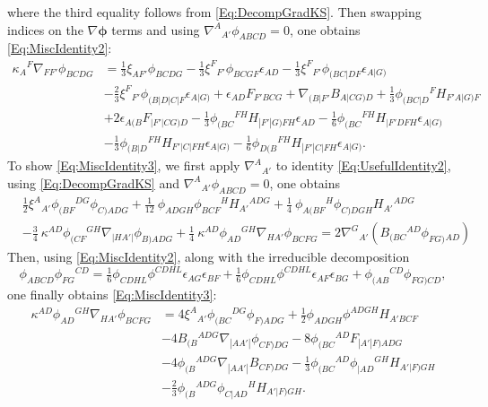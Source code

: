 \documentclass[10pt,a4paper]{article}
\theoremstyle{plain}
\begin{document}
where the third equality follows from \eqref{Eq:DecompGradKS}. Then
swapping indices on the $\nabla\bm\phi$ terms and using
$\nabla^A{}_{A'}\phi_{ABCD}=0$, one obtains \eqref{Eq:MiscIdentity2}:
\begin{align*}
    \kappa_{A}{}^{F} \nabla_{FF'}\phi_{BCDG} &= \tfrac{1}{3} \xi_{AF'}
    \phi_{BCDG} - \tfrac{1}{3} \xi^{F}{}_{F'} \phi_{BCGF}
    \epsilon_{AD} - \tfrac{1}{3}
    \xi^{F}{}_{F'}\phi_{(BC|DF}\epsilon_{A|G)} \nonumber \\ & -
    \tfrac{2}{3} \xi^{F}{}_{F'}\phi_{(B|D|C|F}\epsilon_{A|G)} +
    \epsilon_{AD} F_{F'BCG} + \nabla_{(B|F'}B_{A|CG)D} + \tfrac{1}{3}
    \phi_{(BC|D}{}^{F}H_{F'A|G)F} \nonumber \\& + 2
    \epsilon_{A(B}F_{|F'\vert CG)D} - \tfrac{1}{3}
    \phi_{(BC}{}^{FH}H_{|F'|G)FH}\epsilon_{AD} - \tfrac{1}{6}
    \phi_{(BC}{}^{FH}H_{|F'DFH}\epsilon_{A|G)} \nonumber\\ & -
    \tfrac{1}{3} \phi_{(B|D}{}^{FH}H_{F'|C|FH}\epsilon_{A|G)} -
    \tfrac{1}{6}
    \phi_{D(B}{}^{FH}H_{|F'|C|FH}\epsilon_{A|G)}.
\end{align*}
To show \eqref{Eq:MiscIdentity3}, we first apply $\nabla^A{}_{A'}$ to
identity \eqref{Eq:UsefulIdentity2}, using \eqref{Eq:DecompGradKS} and
$\nabla^A{}_{A'}\phi_{ABCD}=0$, one obtains
\begin{align*}
&\tfrac{1}{2} \xi^{A}{}_{A'} \phi_{(BF}{}^{DG} \phi_{C)ADG} + \tfrac{1}{12} \
\phi_{ADGH} \phi_{BCF}{}^{H} H_{A'}{}^{ADG} + \tfrac{1}{4} \
\phi_{A(BF}{}^{H} \phi_{C)DGH} H_{A'}{}^{ADG}  \\
&-  \tfrac{3}{4} \
\kappa^{AD} \phi_{(CF}{}^{GH} \nabla_{\vert HA'\vert}\phi_{B)ADG} + \tfrac{1}{4} \
\kappa^{AD} \phi_{AD}{}^{GH} \nabla_{HA'}\phi_{BCFG} = 2 \nabla^G{}_{A'}(B_{(BC}{}^{AD} \phi_{FG)}{}_{AD})	
\end{align*}
Then, using \eqref{Eq:MiscIdentity2}, along with the irreducible decomposition 
\begin{equation*}
\phi_{ABCD} \phi_{FG}{}^{CD} = \tfrac{1}{6} \phi_{CDHL} \phi^{CDHL}
\epsilon_{AG} \epsilon_{BF} + \tfrac{1}{6} \phi_{CDHL} \phi^{CDHL}
\epsilon_{AF} \epsilon_{BG} +
\phi_{(AB}{}^{CD}\phi_{FG)CD}, %
\end{equation*}
one finally obtains \eqref{Eq:MiscIdentity3}: 
\begin{align*}
    \kappa^{AD} \phi_{AD}{}^{GH} \nabla_{HA'}\phi_{BCFG} &= 4
    \xi^{A}{}_{A'}\phi_{(BC}{}^{DG}\phi_{F)ADG} + \tfrac{1}{2}
    \phi_{ADGH} \phi^{ADGH} H_{A'BCF} \nonumber\\ & - 4
    B_{(B}{}^{ADG}\nabla_{|AA'|}\phi_{CF)DG} - 8
    \phi_{(BC}{}^{AD}F_{|A'|F)ADG}\nonumber \\ & - 4
    \phi_{(B}{}^{ADG}\nabla_{|AA'|}B_{CF)DG} - \tfrac{1}{3}
    \phi_{(BC}{}^{AD}\phi_{|AD}{}^{GH}H_{A'|F)GH}\nonumber \\ & -
    \tfrac{2}{3}
    \phi_{(B}{}^{ADG}\phi_{C|AD}{}^{H}H_{A'|F)GH}. \label{Eq:MiscIdentity3}
\end{align*}
\end{document}

